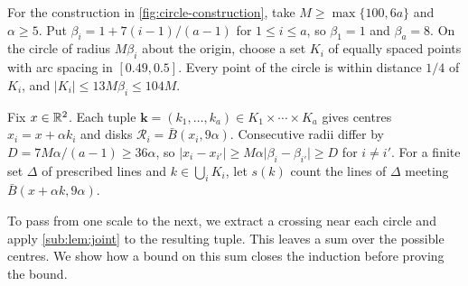 \documentclass[11pt,letterpaper]{article}
\begin{document}
For the construction in \cref{fig:circle-construction}, take $M\ge\max\{100,6a\}$ and $\alpha\ge5$. Put $\beta_i=1+7(i-1)/(a-1)$ for $1\le i\le a$, so $\beta_1=1$ and $\beta_a=8$. On the circle of radius $M\beta_i$ about the origin, choose a set $K_i$ of equally spaced points with arc spacing in $[0.49,0.5]$. Every point of the circle is within distance $1/4$ of $K_i$, and $\lvert K_i\rvert\le13M\beta_i\le104M$.

Fix $x\in\mathbb R^2$. Each tuple $\boldsymbol k=(k_1,\dots,k_a)\in K_1\times\cdots\times K_a$ gives centres $x_i=x+\alpha k_i$ and disks $\mathcal R_i=\bar B(x_i,9\alpha)$. Consecutive radii differ by $D=7M\alpha/(a-1)\ge36\alpha$, so $\lvert x_i-x_{i'}\rvert\ge M\alpha\lvert\beta_i-\beta_{i'}\rvert\ge D$ for $i\ne i'$. For a finite set $\Delta$ of prescribed lines and $k\in\bigcup_i K_i$, let $s(k)$ count the lines of $\Delta$ meeting $\bar B(x+\alpha k,9\alpha)$.

\par\smallskip\noindent
\begin{minipage}{\linewidth}
  \centering
  
  \label{fig:circle-construction}
\end{minipage}
\par\smallskip

To pass from one scale to the next, we extract a crossing near each circle and apply \cref{sub:lem:joint} to the resulting tuple. This leaves a sum over the possible centres. We show how a bound on this sum closes the induction before proving the bound.
\end{document}
